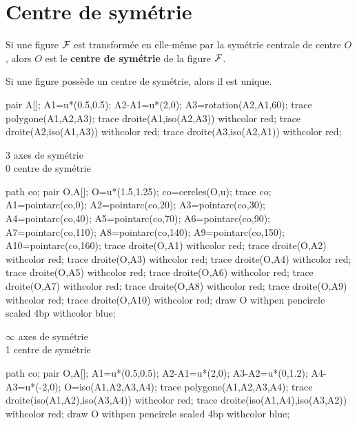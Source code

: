 \section{Centre de symétrie}
\begin{definition}
    Si une figure $\cal F$ est transformée en elle-même par la symétrie centrale de centre $O$, alors $O$ est le \textbf{centre de symétrie} de la figure $\cal F$.
 \end{definition}
 
 \begin{exemple*1}
    Si une figure possède un centre de symétrie, alors il est unique.
    {
    \begin{multicols}{3}
       \begin{center}
         \begin{Geometrie}[CoinHD={u*(3,2.5)}]
            pair A[];
            A1=u*(0.5,0.5);
            A2-A1=u*(2,0);
            A3=rotation(A2,A1,60);
            trace polygone(A1,A2,A3);
            trace droite(A1,iso(A2,A3)) withcolor red;
            trace droite(A2,iso(A1,A3)) withcolor red;
            trace droite(A3,iso(A2,A1)) withcolor red;
         \end{Geometrie}
    
          3 axes de symétrie \\
          0 centre de symétrie
          \begin{Geometrie}[CoinHD={u*(3,2.5)}]
            path co;
            pair O,A[];
            O=u*(1.5,1.25);
            co=cercles(O,u);
            trace co;
            A1=pointarc(co,0);
            A2=pointarc(co,20);
            A3=pointarc(co,30);
            A4=pointarc(co,40);
            A5=pointarc(co,70);
            A6=pointarc(co,90);
            A7=pointarc(co,110);
            A8=pointarc(co,140);
            A9=pointarc(co,150);
            A10=pointarc(co,160);
            trace droite(O,A1) withcolor red;
            trace droite(O,A2) withcolor red;
            trace droite(O,A3) withcolor red;
            trace droite(O,A4) withcolor red;
            trace droite(O,A5) withcolor red;
            trace droite(O,A6) withcolor red;
            trace droite(O,A7) withcolor red;
            trace droite(O,A8) withcolor red;
            trace droite(O,A9) withcolor red;
            trace droite(O,A10) withcolor red;
            draw O withpen pencircle scaled 4bp withcolor blue;
         \end{Geometrie}
    
          $\infty$ axes de symétrie \\
          1 centre de symétrie
          \begin{Geometrie}[CoinHD={u*(3,2.5)}]
            path co;
            pair O,A[];            
            A1=u*(0.5,0.5);
            A2-A1=u*(2,0);
            A3-A2=u*(0,1.2);
            A4-A3=u*(-2,0);
            O=iso(A1,A2,A3,A4);
            trace polygone(A1,A2,A3,A4);
            trace droite(iso(A1,A2),iso(A3,A4)) withcolor red;
            trace droite(iso(A1,A4),iso(A3,A2)) withcolor red;
            draw O withpen pencircle scaled 4bp withcolor blue;
         \end{Geometrie}            
    

\end{center}
\end{multicols}}
\end{exemple*1}
